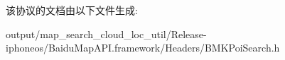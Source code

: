该协议的文档由以下文件生成\+:\begin{DoxyCompactItemize}
\item 
output/map\+\_\+search\+\_\+cloud\+\_\+loc\+\_\+util/\+Release-\/iphoneos/\+Baidu\+Map\+A\+P\+I.\+framework/\+Headers/B\+M\+K\+Poi\+Search.\+h\end{DoxyCompactItemize}
